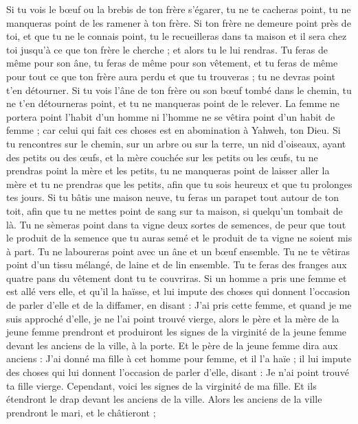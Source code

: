 \begin{multicols}{2}
\VerseOne{}Si tu vois le bœuf ou la brebis de ton frère s’égarer, tu ne te cacheras point, tu ne manqueras point de les ramener à ton frère.
Si ton frère ne demeure point près de toi, et que tu ne le connais point, tu le recueilleras dans ta maison et il sera chez toi jusqu'à ce que ton frère le cherche ; et alors tu le lui rendras.
Tu feras de même pour son âne, tu feras de même pour son vêtement, et tu feras de même pour tout ce que ton frère aura perdu et que tu trouveras ; tu ne devras point t’en détourner.
Si tu vois l'âne de ton frère ou son bœuf tombé dans le chemin, tu ne t’en détourneras point, et tu ne manqueras point de le relever.
La femme ne portera point l'habit d'un homme ni l'homme ne se vêtira point d'un habit de femme ; car celui qui fait ces choses est en abomination à Yahweh, ton Dieu\FTNT{}.
Si tu rencontres sur le chemin, sur un arbre ou sur la terre, un nid d'oiseaux, ayant des petits ou des œufs, et la mère couchée sur les petits ou les œufs, tu ne prendras point la mère et les petits,
tu ne manqueras point de laisser aller la mère et tu ne prendras que les petits, afin que tu sois heureux et que tu prolonges tes jours.
Si tu bâtis une maison neuve, tu feras un parapet tout autour de ton toit, afin que tu ne mettes point de sang sur ta maison, si quelqu'un tombait de là.
Tu ne sèmeras point dans ta vigne deux sortes de semences, de peur que tout le produit de la semence que tu auras semé et le produit de ta vigne ne soient mis à part.
Tu ne laboureras point avec un âne et un bœuf ensemble.
Tu ne te vêtiras point d'un tissu mélangé, de laine et de lin ensemble.
Tu te feras des franges aux quatre pans du vêtement dont tu te couvriras.
Si un homme a pris une femme et est allé vers elle, et qu’il la haïsse,
et lui impute des choses qui donnent l’occasion de parler d’elle et de la diffamer, en disant : J'ai pris cette femme, et quand je me suis approché d'elle, je ne l'ai point trouvé vierge,
alors le père et la mère de la jeune femme prendront et produiront les signes de la virginité de la jeune femme devant les anciens de la ville, à la porte.
Et le père de la jeune femme dira aux anciens : J'ai donné ma fille à cet homme pour femme, et il l'a haïe ;
il lui impute des choses qui lui donnent l’occasion de parler d’elle, disant : Je n'ai point trouvé ta fille vierge. Cependant, voici les signes de la virginité de ma fille. Et ils étendront le drap devant les anciens de la ville.
Alors les anciens de la ville prendront le mari, et le châtieront ;

\end{multicols}
